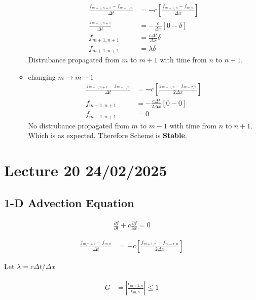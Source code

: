 \documentclass[fleqn,10pt]{SelfArx} %
\begin{document}
\begin{enumerate}
\begin{itemize}
			\begin{align*}
				\frac{f_{m+1,n+1} - f_{m+1,n}}{\Delta t} &= -c\left[\frac{f_{m+1,n} - f_{m,n}}{\Delta x}\right] \\
				\frac{f_{m+1,n+1}}{\Delta t} &= -\frac{c}{\Delta x}\left[0-\delta\right] \\
				f_{m+1,n+1} &= \frac{c\Delta t}{\Delta x}\delta \\
				f_{m+1,n+1} &= \lambda\delta \tag{19.6} \label{eq:19.6}
			\end{align*}
			Distrubance propagated from \( m \) to \( m+1 \) with time from \( n \) to \( n +1 \).
			\item changing \( m \rightarrow m-1 \)
			\begin{align*}
				\frac{f_{m-1,n+1} - f_{m-1,n}}{\Delta t} &= -c\left[\frac{f_{m-1,n} - f_{m-2,n}}{2\Delta x}\right] \\
				f_{m-1,n+1} &= -\frac{c\Delta t}{2\Delta x}[0 - 0 ] \\
				f_{m-1,n+1} &= 0 \tag{19.7} \label{eq:19.7}
			\end{align*}
			No distrubance propagated from \( m \) to \( m-1 \) with time from \( n \) to \( n +1 \). \\
			Which is as expected. Therefore Scheme is \textbf{Stable}.
		\end{itemize}
\end{enumerate}

\clearpage

\section{Lecture 20 24/02/2025}
\subsection{1-D Advection Equation}
\begin{align*}
	\frac{\partial f}{\partial t} + c\frac{\partial f}{\partial x} = 0 \tag{20.1} \label{eq:1dadvectioneq-6}
\end{align*}

\begin{align*}
	\frac{f_{m,n+1} - f_{m,n}}{\Delta t} &= -c\left[\frac{f_{m+1,n} - f_{m-1,n}}{2\Delta x}\right] \tag{20.2} \label{eq:20.2}
\end{align*}

Let \( \lambda = c\Delta t/\Delta x \)

\begin{align*}
    G &= \left| \frac{\epsilon_{m+1,n}}{\epsilon_{m,n}} \right| \leq 1
\end{align*}
\end{document}
